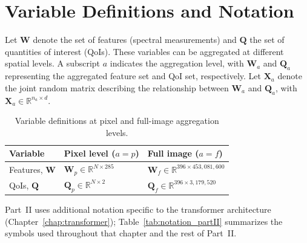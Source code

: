 \documentclass[11pt]{report}
\newcommand{\R}{\mathbb{R}}
\begin{document}
\section{Variable Definitions and Notation}

Let $\mathbf{W}$ denote the set of features (spectral measurements) and $\mathbf{Q}$ the set of quantities of interest (QoIs). These variables can be aggregated at different spatial levels. A subscript $a$ indicates the aggregation level, with $\mathbf{W}_a$ and $\mathbf{Q}_a$ representing the aggregated feature set and QoI set, respectively. Let $\mathbf{X}_a$ denote the joint random matrix describing the relationship between $\mathbf{W}_a$ and $\mathbf{Q}_a$, with $\mathbf{X}_a \in \R^{n_a \times d}$.

\begin{table}[htbp]
\centering
\caption{Variable definitions at pixel and full-image aggregation levels.}
\label{tab:variables}
\begin{tabular}{lll}
\hline
\textbf{Variable} & \textbf{Pixel level ($a = p$)} & \textbf{Full image ($a = f$)} \\
\hline
Features, $\mathbf{W}$ & $\mathbf{W}_p \in \R^{N \times 285}$ & $\mathbf{W}_f \in \R^{396 \times 453{,}081{,}600}$ \\
QoIs, $\mathbf{Q}$ & $\mathbf{Q}_p \in \R^{N \times 2}$ & $\mathbf{Q}_f \in \R^{396 \times 3{,}179{,}520}$ \\
\hline
\end{tabular}
\end{table}

Part~II uses additional notation specific to the transformer architecture (Chapter~\ref{chap:transformer}); Table~\ref{tab:notation_partII} summarizes the symbols used throughout that chapter and the rest of Part~II.
\end{document}
